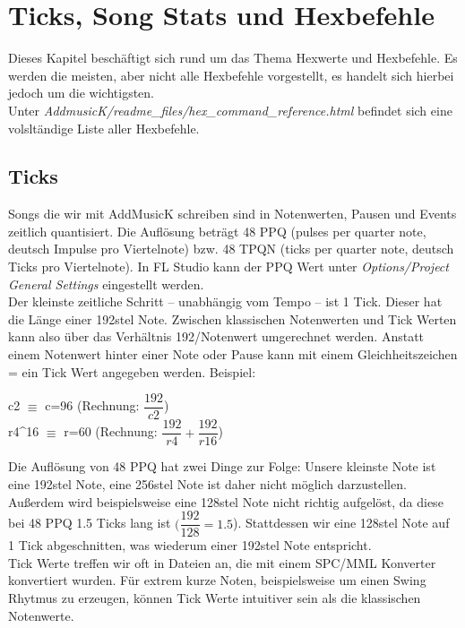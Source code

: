 \section{Ticks, Song Stats und Hexbefehle}

Dieses Kapitel beschäftigt sich rund um das Thema Hexwerte und Hexbefehle. Es werden die meisten, aber nicht alle Hexbefehle vorgestellt, es handelt sich hierbei jedoch um die wichtigsten. \\
Unter \textit{AddmusicK/readme\_files/hex\_command\_reference.html} befindet sich eine volsltändige Liste aller Hexbefehle.

\subsection{Ticks}

Songs die wir mit AddMusicK schreiben sind in Notenwerten, Pausen und Events zeitlich quantisiert.
Die Auflösung beträgt 48 PPQ (pulses per quarter note, deutsch Impulse pro Viertelnote) bzw. 48 TPQN (ticks per quarter note, deutsch Ticks pro Viertelnote). In FL Studio kann der PPQ Wert unter \textit{Options/Project General Settings} eingestellt werden.\\
Der kleinste zeitliche Schritt -- unabhängig vom Tempo -- ist 1 Tick. Dieser hat die Länge einer 192stel Note. Zwischen klassischen Notenwerten und Tick Werten kann also über das Verhältnis 192/Notenwert umgerechnet werden. Anstatt einem Notenwert hinter einer Note oder Pause kann mit einem Gleichheitszeichen = ein Tick Wert angegeben werden. Beispiel:

\bigskip

c2 $ \equiv $ c=96 (Rechnung: $ \dfrac{192}{c2} $)\\
r4\textasciicircum16 $ \equiv $ r=60 (Rechnung: $ \dfrac{192}{r4} +  \dfrac{192}{r16} $)\\

\bigskip

Die Auflösung von 48 PPQ hat zwei Dinge zur Folge: Unsere kleinste Note ist eine 192stel Note, eine 256stel Note ist daher nicht möglich darzustellen. Außerdem wird beispielsweise eine 128stel Note nicht richtig aufgelöst, da diese bei 48 PPQ 1.5 Ticks lang ist $(\dfrac{192}{128} = 1.5$). Stattdessen wir eine 128stel Note auf 1 Tick abgeschnitten, was wiederum einer 192stel Note entspricht. \\
Tick Werte treffen wir oft in Dateien an, die mit einem SPC/MML Konverter konvertiert wurden. Für extrem kurze Noten, beispielsweise um einen Swing Rhytmus zu erzeugen, können Tick Werte intuitiver sein als die klassischen Notenwerte.

